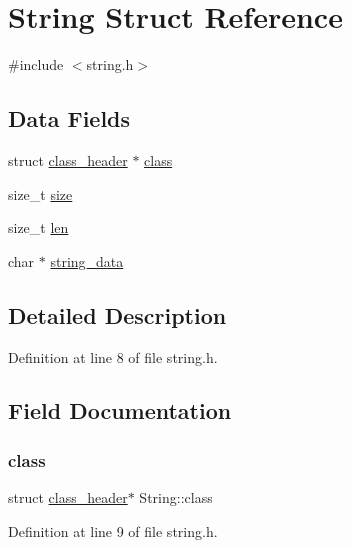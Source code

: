 \hypertarget{structString}{}\section{String Struct Reference}
\label{structString}


{\ttfamily \#include $<$string.\+h$>$}

\subsection*{Data Fields}
\begin{DoxyCompactItemize}
\item 
struct \mbox{\hyperlink{structclass__header}{class\+\_\+header}} $\ast$ \mbox{\hyperlink{structString_a0f471e21019b908e3737734beee23b54}{class}}
\item 
size\+\_\+t \mbox{\hyperlink{structString_a467ea29ffa5dd45a89f7c01e199fd104}{size}}
\item 
size\+\_\+t \mbox{\hyperlink{structString_a19c7dc3e73f362a699de38845b386296}{len}}
\item 
char $\ast$ \mbox{\hyperlink{structString_ac529e31052a3b2f49fd1f80cbe2327bb}{string\+\_\+data}}
\end{DoxyCompactItemize}


\subsection{Detailed Description}


Definition at line 8 of file string.\+h.



\subsection{Field Documentation}
\mbox{\label{structString_a0f471e21019b908e3737734beee23b54}} 
\subsubsection{\texorpdfstring{class}{class}}
{\footnotesize\ttfamily struct \mbox{\hyperlink{structclass__header}{class\+\_\+header}}$\ast$ String\+::class}



Definition at line 9 of file string.\+h.

\mbox{\label{structString_a19c7dc3e73f362a699de38845b386296}} 

